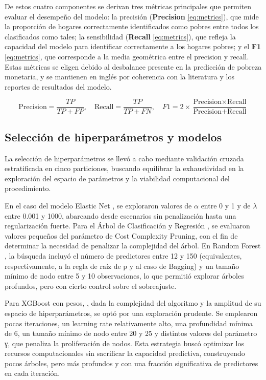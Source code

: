 De estos cuatro componentes se derivan tres métricas principales que permiten evaluar el desempeño del modelo: la precisión (\textbf{Precision} \ref{eq:metrics}), que mide la proporción de hogares correctamente identificados como pobres entre todos los clasificados como tales; la sensibilidad (\textbf{Recall} \ref{eq:metrics}), que refleja la capacidad del modelo para identificar correctamente a los hogares pobres; y el \textbf{F1} \ref{eq:metrics}, que corresponde a la media geométrica entre el precision y recall. Estas métricas se eligen debido al desbalance presente en la predicción de pobreza monetaria, y se mantienen en inglés por coherencia con la literatura y los reportes de resultados del modelo.

\begin{equation}
\text{Precision} = \frac{TP}{TP + FP}, \quad
\text{Recall} = \frac{TP}{TP + FN}, \quad
F1 = 2 \times \frac{\text{Precision} \times \text{Recall}}{\text{Precision} + \text{Recall}}
\label{eq:metrics}
\end{equation}

\subsection{Selección de  hiperparámetros y modelos}

La selección de hiperparámetros se llevó a cabo mediante validación cruzada estratificada en cinco particiones, buscando equilibrar la exhaustividad en la exploración del espacio de parámetros y la viabilidad computacional del procedimiento.




En el caso del modelo Elastic Net \cite{zou-2005}, se exploraron valores de $\alpha$ entre 0 y 1 y de $\lambda$ entre 0.001 y 1000, abarcando desde escenarios sin penalización hasta una regularización fuerte. Para el Árbol de Clasificación y Regresión \cite{breiman1984cart}, se evaluaron valores pequeños del parámetro de Cost Complexity Pruning, con el fin de determinar la necesidad de penalizar la complejidad del árbol. En Random Forest \cite{breiman-2001}, la búsqueda incluyó el número de predictores entre 12 y 150 (equivalentes, respectivamente, a la regla de raíz de p  y al caso de Bagging) y un tamaño mínimo de nodo entre 5 y 10 observaciones, lo que permitió explorar árboles profundos, pero con cierto control sobre el sobreajuste.

Para XGBoost con pesos, \cite{chen2016xgboost}, dada la complejidad del algoritmo y la amplitud de su espacio de hiperparámetros, se optó por una exploración prudente. Se emplearon pocas iteraciones, un learning rate relativamente alto, una profundidad mínima de 6, un tamaño mínimo de nodo entre 20 y 25 y distintos valores del parámetro γ, que penaliza la proliferación de nodos. Esta estrategia buscó optimizar los recursos computacionales sin sacrificar la capacidad predictiva, construyendo pocos árboles, pero más profundos y con una fracción significativa de predictores en cada iteración.


